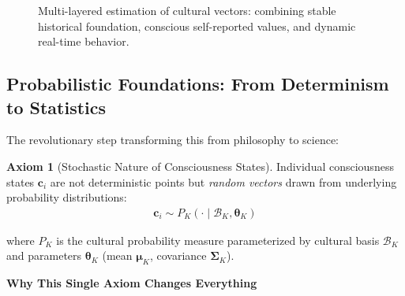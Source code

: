 \documentclass[11pt,a4paper]{article}
\theoremstyle{definition}
\newtheorem{axiom}{Axiom}[section]
\theoremstyle{remark}
\newcommand{\cc}{\mathbf{c}}
\begin{document}
\begin{small}
\begin{figure}[H]
\caption{Multi-layered estimation of cultural vectors: combining stable historical foundation, conscious self-reported values, and dynamic real-time behavior.}
\label{fig:multilayer_estimation}
\end{figure}

\subsection{Probabilistic Foundations: From Determinism to Statistics}

The revolutionary step transforming this from philosophy to science:

\begin{axiom}[Stochastic Nature of Consciousness States]
Individual consciousness states \(\cc_i\) are not deterministic points but \textit{random vectors} drawn from underlying probability distributions:
\begin{align}
\cc_i \sim P_K(\cdot \mid \mathcal{B}_K, \boldsymbol{\theta}_K)
\end{align}

where \(P_K\) is the cultural probability measure parameterized by cultural basis \(\mathcal{B}_K\) and parameters \(\boldsymbol{\theta}_K\) (mean \(\boldsymbol{\mu}_K\), covariance \(\boldsymbol{\Sigma}_K\)).
\end{axiom}

\begin{mdframed}[backgroundcolor=yellow!10,linewidth=2pt]
\textbf{Why This Single Axiom Changes Everything}


\end{mdframed}
\end{small}
\end{document}
